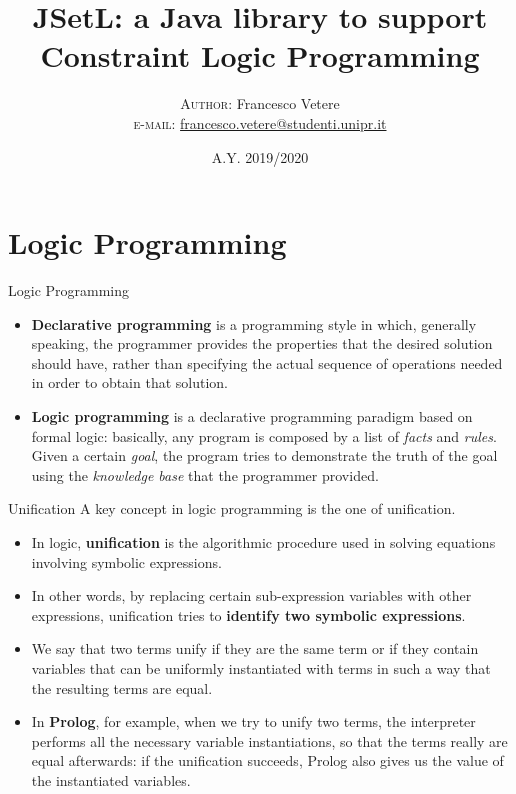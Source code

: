 \documentclass{beamer}
\title {JSetL: a Java library to support Constraint Logic Programming}
\author[Vetere F.] {
\large{\textsc{Author}: Francesco Vetere\\ \small \textsc{e-mail:} \href{mailto:francesco.vetere@studenti.unipr.it}{francesco.vetere@studenti.unipr.it} }
}
\institute[University of Parma]
{
\textsc{University of Parma}
}
\date {\textsc{A.Y. 2019/2020}}
\begin{document}
\begin{frame}
\maketitle
\end{frame}


\section{Logic Programming}
\begin{frame}{Logic Programming}
\begin{itemize}
\item \textbf{Declarative programming} is a programming style in which, generally speaking, the
programmer provides the properties that the desired solution should have, rather than specifying the actual sequence of operations needed in order to obtain that solution.
\item \textbf{Logic programming} is a declarative programming paradigm based on formal logic: basically, any program is composed by a list of \emph{facts} and \emph{rules}.\\
Given a certain \textit{goal}, the program tries to demonstrate the truth of the goal using the \emph{knowledge base} that the programmer provided.
\end{itemize}
\end{frame}

\begin{frame}{Unification}
A key concept in logic programming is the one of unification.\\
\begin{itemize}
\item In logic, \textbf{unification} is the algorithmic procedure used in solving equations involving symbolic expressions. \\
\item In other words, by replacing certain sub-expression variables with other expressions, unification tries to \textbf{identify two symbolic expressions}.\\
\item We say that two terms unify if they are the same term or if they contain variables that can be uniformly instantiated with terms in such a way that the resulting terms are equal. \\
\item In \textbf{Prolog}, for example, when we try to unify two terms, the interpreter performs all the necessary variable instantiations, so that the terms really are equal afterwards: if the unification succeeds, Prolog also gives us the value of the instantiated variables.
\end{itemize}
\end{frame}
\end{document}
